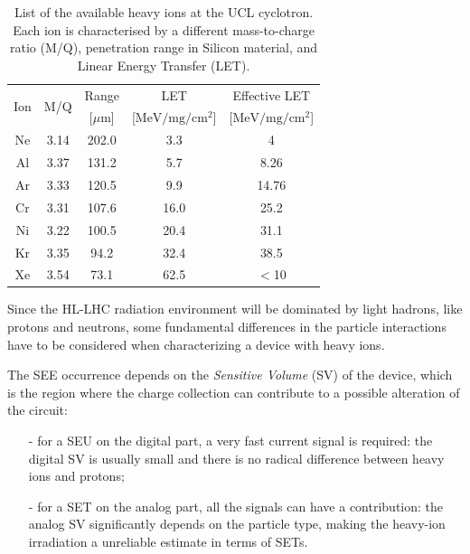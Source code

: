 \begin{table}[b]
    \centering
    \begin{tabular}{c | c | c | c | c}
        \hline
        \hline
        \multirow{2}{*}{Ion} & \multirow{2}{*}{M/Q} & Range & LET & Effective LET \\
        &  & [$\mu$m] & [$\textrm{MeV}/\textrm{mg}/\textrm{cm}^2$] & [$\textrm{MeV}/\textrm{mg}/\textrm{cm}^2$] \\
        \hline
        Ne & 3.14 & 202.0 & 3.3 & 4 \\
        Al & 3.37 & 131.2 & 5.7 & 8.26 \\
        Ar & 3.33 & 120.5 & 9.9 & 14.76 \\
        Cr & 3.31 & 107.6 & 16.0 & 25.2 \\
        Ni & 3.22 & 100.5 & 20.4 & 31.1 \\
        Kr & 3.35 & 94.2 & 32.4 & 38.5 \\
        Xe & 3.54 & 73.1 & 62.5 & $<$10 \\
        \hline
        \hline
    \end{tabular}
    \caption{List of the available heavy ions at the UCL cyclotron. Each ion is characterised by a different mass-to-charge ratio (M/Q), penetration range in Silicon material, and Linear Energy Transfer (LET).}
    \label{tab:SEE_Ions}
\end{table}

\bigbreak

Since the HL-LHC radiation environment will be dominated by light hadrons, like protons and neutrons, some fundamental differences in the particle interactions have to be considered when characterizing a device with heavy ions.

The SEE occurrence depends on the \textit{Sensitive Volume} (SV) of the device, which is the region where the charge collection can contribute to a possible alteration of the circuit:
\begin{itemize}
    \item [-] for a SEU on the digital part, a very fast current signal is required: the digital SV is usually small and there is no radical difference between heavy ions and protons;
    \item [-] for a SET on the analog part, all the signals can have a contribution: the analog SV significantly depends on the particle type, making the heavy-ion irradiation a unreliable estimate in terms of SETs.
\end{itemize}

